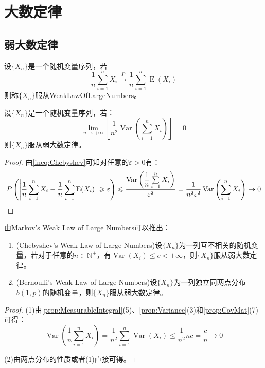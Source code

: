 \section{大数定律}

\subsection{弱大数定律}
\begin{definition}
	设$\{X_n\}$是一个随机变量序列，若
	\begin{equation*}
		\frac{1}{n}\sum_{i=1}^{n}X_i\overset{P}{\longrightarrow}\frac{1}{n}\sum_{i=1}^{n}\operatorname{E}(X_i)
	\end{equation*}
	则称$\{X_n\}$服从\gls{WeakLawOfLargeNumbers}。
\end{definition}
\begin{theorem}
	设$\{X_n\}$是一个随机变量序列，若：
	\begin{equation*}
		\lim_{n\to+\infty}\left[\frac{1}{n^2}\operatorname{Var}\left(\sum_{i=1}^{n}X_i\right)\right]=0
	\end{equation*}
	则$\{X_n\}$服从弱大数定律。
\end{theorem}
\begin{proof}
	由\cref{ineq:Chebyshev}可知对任意的$\varepsilon>0$有：
	\begin{equation*}
		P\left(\left|\frac{1}{n}\sum_{i=1}^{n}X_i-\frac{1}{n}\sum_{i=1}^{n}\operatorname{E}(X_i)\right|\geqslant\varepsilon\right)\leqslant\frac{\operatorname{Var}\left(\dfrac{1}{n}\sum\limits_{i=1}^{n}X_i\right)}{\varepsilon^2}=\frac{1}{n^2\varepsilon^2}\operatorname{Var}\left(\sum_{i=1}^{n}X_i\right)\to0\qedhere
	\end{equation*}
\end{proof}
\begin{corollary}
	由Markov's Weak Law of Large Numbers可以推出：
	\begin{enumerate}
		\item (Chebyshev's Weak Law of Large Numbers)设$\{X_n\}$为一列互不相关的随机变量，若对于任意的$n\in\mathbb{N}^+$，有$\operatorname{Var}(X_i)\leqslant c<+\infty$，则$\{X_n\}$服从弱大数定律。
		\item (Bernoulli's Weak Law of Large Numbers)设$\{X_n\}$为一列独立同两点分布$b(1,p)$的随机变量，则$\{X_n\}$服从弱大数定律。
	\end{enumerate}
\end{corollary}
\begin{proof}
	(1)由\cref{prop:MeasurableIntegral}(5)、\cref{prop:Variance}(3)和\cref{prop:CovMat}(7)可得：
	\begin{equation*}
		\operatorname{Var}\left(\frac{1}{n}\sum_{i=1}^{n}X_i\right)=\frac{1}{n^2}\sum_{i=1}^{n}\operatorname{Var}(X_i)\leqslant\frac{1}{n^2}nc=\frac{c}{n}\to0
	\end{equation*}\par
	(2)由两点分布的性质或者(1)直接可得。
\end{proof}
